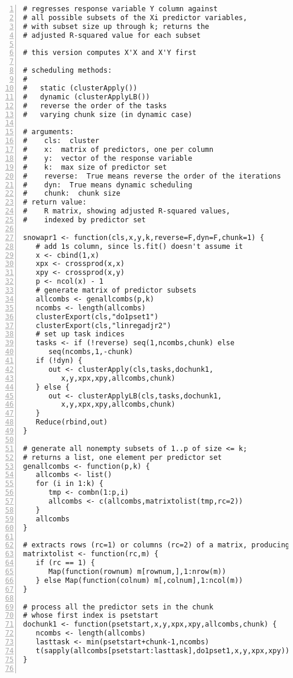 \begin{lstlisting}[numbers=left]
# regresses response variable Y column against 
# all possible subsets of the Xi predictor variables, 
# with subset size up through k; returns the
# adjusted R-squared value for each subset

# this version computes X'X and X'Y first

# scheduling methods:
#
#   static (clusterApply())
#   dynamic (clusterApplyLB())
#   reverse the order of the tasks
#   varying chunk size (in dynamic case)

# arguments:
#    cls:  cluster
#    x:  matrix of predictors, one per column
#    y:  vector of the response variable
#    k:  max size of predictor set
#    reverse:  True means reverse the order of the iterations
#    dyn:  True means dynamic scheduling
#    chunk:  chunk size 
# return value:
#    R matrix, showing adjusted R-squared values, 
#    indexed by predictor set

snowapr1 <- function(cls,x,y,k,reverse=F,dyn=F,chunk=1) {
   # add 1s column, since ls.fit() doesn't assume it
   x <- cbind(1,x)
   xpx <- crossprod(x,x)
   xpy <- crossprod(x,y)
   p <- ncol(x) - 1
   # generate matrix of predictor subsets
   allcombs <- genallcombs(p,k)
   ncombs <- length(allcombs)
   clusterExport(cls,"do1pset1")
   clusterExport(cls,"linregadjr2")
   # set up task indices 
   tasks <- if (!reverse) seq(1,ncombs,chunk) else 
      seq(ncombs,1,-chunk) 
   if (!dyn) {
      out <- clusterApply(cls,tasks,dochunk1,
         x,y,xpx,xpy,allcombs,chunk)
   } else {
      out <- clusterApplyLB(cls,tasks,dochunk1,
         x,y,xpx,xpy,allcombs,chunk)
   }
   Reduce(rbind,out)
}

# generate all nonempty subsets of 1..p of size <= k; 
# returns a list, one element per predictor set
genallcombs <- function(p,k) {
   allcombs <- list()
   for (i in 1:k) {
      tmp <- combn(1:p,i)
      allcombs <- c(allcombs,matrixtolist(tmp,rc=2))
   }
   allcombs
}

# extracts rows (rc=1) or columns (rc=2) of a matrix, producing a list
matrixtolist <- function(rc,m) {
   if (rc == 1) {
      Map(function(rownum) m[rownum,],1:nrow(m))
   } else Map(function(colnum) m[,colnum],1:ncol(m))
}

# process all the predictor sets in the chunk 
# whose first index is psetstart
dochunk1 <- function(psetstart,x,y,xpx,xpy,allcombs,chunk) {
   ncombs <- length(allcombs)
   lasttask <- min(psetstart+chunk-1,ncombs)
   t(sapply(allcombs[psetstart:lasttask],do1pset1,x,y,xpx,xpy))
}


\end{lstlisting}
